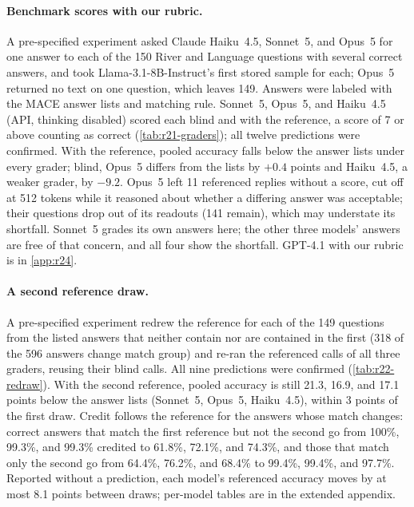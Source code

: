 \paragraph{Benchmark scores with our rubric.}
A pre-specified experiment asked Claude Haiku~4.5, Sonnet~5, and Opus~5 for one answer to each of the 150 River and Language questions with several correct answers, and took Llama-3.1-8B-Instruct's first stored sample for each; Opus~5 returned no text on one question, which leaves 149. Answers were labeled with the \textsc{MACE} answer lists and matching rule. Sonnet~5, Opus~5, and Haiku~4.5 (API, thinking disabled) scored each blind and with the reference, a score of 7 or above counting as correct (\cref{tab:r21-graders}); all twelve predictions were confirmed. With the reference, pooled accuracy falls below the answer lists under every grader; blind, Opus~5 differs from the lists by $+0.4$ points and Haiku~4.5, a weaker grader, by $-9.2$. Opus~5 left 11 referenced replies without a score, cut off at 512 tokens while it reasoned about whether a differing answer was acceptable; their questions drop out of its readouts (141 remain), which may understate its shortfall. Sonnet~5 grades its own answers here; the other three models' answers are free of that concern, and all four show the shortfall. GPT-4.1 with our rubric is in \cref{app:r24}.

\begin{table}[htbp]
\centering
\caption{The benchmark study under three graders: pooled changes against the answer lists (points, 95\% CI) at score thresholds 5, 7, and 10, the max rule at 7, and the shares of correct non-matching answers scored 3 or below, blind and with the reference. For Opus~5 and Haiku~4.5, threshold 7 and the max rule carry registered predictions and thresholds 5 and 10 are registered readouts; Sonnet~5's thresholds 5 and 10 and its max rule are post hoc.}
\label{tab:r21-graders}
\footnotesize

\end{table}

\paragraph{A second reference draw.}
A pre-specified experiment redrew the reference for each of the 149 questions from the listed answers that neither contain nor are contained in the first (318 of the 596 answers change match group) and re-ran the referenced calls of all three graders, reusing their blind calls. All nine predictions were confirmed (\cref{tab:r22-redraw}). With the second reference, pooled accuracy is still 21.3, 16.9, and 17.1 points below the answer lists (Sonnet~5, Opus~5, Haiku~4.5), within 3 points of the first draw. Credit follows the reference for the answers whose match changes: correct answers that match the first reference but not the second go from 100\%, 99.3\%, and 99.3\% credited to 61.8\%, 72.1\%, and 74.3\%, and those that match only the second go from 64.4\%, 76.2\%, and 68.4\% to 99.4\%, 99.4\%, and 97.7\%. Reported without a prediction, each model's referenced accuracy moves by at most 8.1 points between draws; per-model tables are in the extended appendix.

